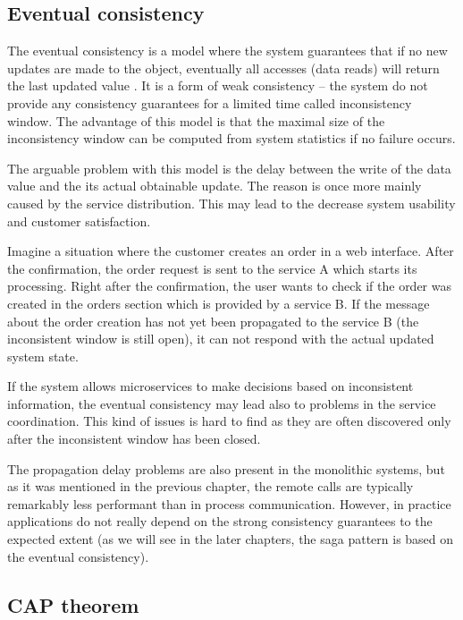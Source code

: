 \documentclass[oneside,
  digital, %
  table,   %
  nolof,     %
  nolot,     %
]{fithesis3}
\begin{document}
\subsection{Eventual consistency}

The eventual consistency is a model where the system guarantees that if no new updates are made to the object, eventually all accesses (data reads) will return the last updated value \cite{event_consist}. It is a form of weak consistency -- the system do not provide any consistency guarantees for a limited time called inconsistency window. The advantage of this model is that the maximal size of the inconsistency window can be computed from system statistics if no failure occurs.

The arguable problem with this model is the delay between the write of the data value and the its actual obtainable update. The reason is once more mainly caused by the service distribution. This may lead to the decrease system usability and customer satisfaction.

Imagine a situation where the customer creates an order in a web interface. After the confirmation, the order request is sent to the service A which starts its processing. Right after the confirmation, the user wants to check if the order was created in the orders section which is provided by a service B. If the message about the order creation has not yet been propagated to the service B (the inconsistent window is still open), it can not respond with the actual updated system state. 

If the system allows microservices to make decisions based on inconsistent information, the eventual consistency may lead also to problems in the service coordination. This kind of issues is hard to find as they are often discovered only after the inconsistent window has been closed.

The propagation delay problems are also present in the monolithic systems, but as it was mentioned in the previous chapter, the remote calls are typically remarkably less performant than in process communication. However, in practice applications do not really depend on the strong consistency guarantees to the expected extent (as we will see in the later chapters, the saga pattern is based on the eventual consistency). 

\subsection{CAP theorem}
\end{document}
